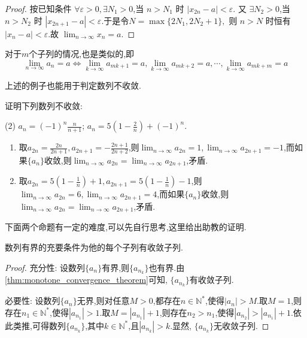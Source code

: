 \begin{proof}
    按已知条件 \(\forall \varepsilon > 0, \exists N_1 > 0\),当 \(n > N_1\) 时 \(|x_{2n} - a| < \varepsilon\).
    又 \(\exists N_2 > 0\),当 \(n > N_2\) 时 \(|x_{2n+1} - a| < \varepsilon\).于是令\( N = \max\{2N_1, 2N_2 + 1\}, \)
    则 \(n > N\) 时恒有 \(|x_n - a| < \varepsilon\).故 \(\lim_{n \to \infty} x_n = a\).

\end{proof}
对于$m$个子列的情况,也是类似的,即
\[\lim_{n\to\infty} a_n = a \Leftrightarrow \lim_{k\to\infty} a_{mk + 1} = a, \lim_{k\to\infty} a_{mk + 2} = a, \cdots, \lim_{k\to\infty} a_{mk + m} = a\]

上述的例子也能用于判定数列不收敛.

\begin{exercise}[1.2.7]
    证明下列数列不收敛:
    \begin{tasks}[label=(\arabic*)](2)
        \task $a_n = (-1)^n \frac{n}{n+1}$;
        \task $a_n = 5 \left(1 - \frac{2}{n}\right) + (-1)^n$.
    \end{tasks}
\end{exercise}

\begin{solution}
    \begin{enumerate}[(1)]
        \item 取$a_{2n} = \frac{2n}{2n+1}, a_{2n+1} = -\frac{2n+1}{2n+2}$,则$\lim_{n \to \infty} a_{2n} = 1, \lim_{n \to \infty} a_{2n+1} = -1$,而如果$\{a_n\}$收敛,则$\lim_{n \to \infty} a_{2n} = \lim_{n \to \infty} a_{2n+1}$,矛盾.
        \item 取$a_{2n} = 5 \left(1 - \frac{1}{n}\right)+1, a_{2n+1} = 5 \left(1 - \frac{1}{n}\right)-1$,则$\lim_{n \to \infty} a_{2n} = 6, \lim_{n \to \infty} a_{2n+1} = 4$,而如果$\{a_n\}$收敛,则$\lim_{n \to \infty} a_{2n} = \lim_{n \to \infty} a_{2n+1}$,矛盾.
    \end{enumerate}
\end{solution}

下面两个命题有一定的难度,可以先自行思考,这里给出助教的证明.

\begin{proposition}
    数列有界的充要条件为他的每个子列有收敛子列.
\end{proposition}

\begin{proof}
    充分性: 设数列$\{a_n\}$有界,则$\{a_{n_k}\}$也有界.由\autoref{thm:monotone_convergence_theorem}可知, $\{a_{n_k}\}$有收敛子列.

    必要性: 设数列$\{a_n\}$无界,则对任意$M > 0$,都存在$n \in \mathbb{N}^*$,使得$|a_n| > M$.取$M = 1$,则存在$n_1 \in \mathbb{N}^*$,使得$|a_{n_1}| > 1$.取$M = |a_{n_1}| + 1$,则存在$n_2 > n_1$,使得$|a_{n_2}| > |a_{n_1}| + 1$.依此类推,可得数列$\{a_{n_k}\}$,其中$k \in \mathbb{N}^*$,且$|a_{n_k}| > k$.显然, $\{a_{n_k}\}$无收敛子列.
\end{proof}

